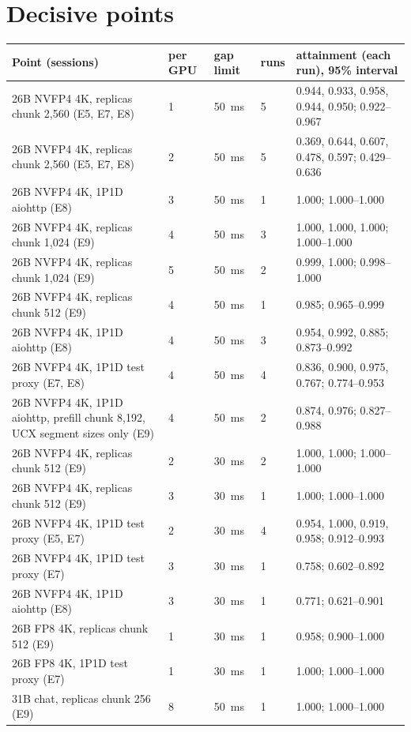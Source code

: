 \documentclass[11pt]{article}
\begin{document}
\section{Decisive points}\label{app:ci}
\begin{table}[H]
\centering\footnotesize
\begin{tabularx}{\linewidth}{Lllll}
\toprule
Point (sessions) & per GPU & gap limit & runs & attainment (each run), 95\% interval \\
\midrule
26B NVFP4 4K, replicas chunk 2,560 (E5, E7, E8) & 1 & 50~ms & 5 & 0.944, 0.933, 0.958, 0.944, 0.950; 0.922--0.967 \\
26B NVFP4 4K, replicas chunk 2,560 (E5, E7, E8) & 2 & 50~ms & 5 & 0.369, 0.644, 0.607, 0.478, 0.597; 0.429--0.636 \\
26B NVFP4 4K, 1P1D aiohttp (E8) & 3 & 50~ms & 1 & 1.000; 1.000--1.000 \\
26B NVFP4 4K, replicas chunk 1,024 (E9) & 4 & 50~ms & 3 & 1.000, 1.000, 1.000; 1.000--1.000 \\
26B NVFP4 4K, replicas chunk 1,024 (E9) & 5 & 50~ms & 2 & 0.999, 1.000; 0.998--1.000 \\
26B NVFP4 4K, replicas chunk 512 (E9) & 4 & 50~ms & 1 & 0.985; 0.965--0.999 \\
26B NVFP4 4K, 1P1D aiohttp (E8) & 4 & 50~ms & 3 & 0.954, 0.992, 0.885; 0.873--0.992 \\
26B NVFP4 4K, 1P1D test proxy (E7, E8) & 4 & 50~ms & 4 & 0.836, 0.900, 0.975, 0.767; 0.774--0.953 \\
26B NVFP4 4K, 1P1D aiohttp, prefill chunk 8,192, UCX segment sizes only (E9) & 4 & 50~ms & 2 & 0.874, 0.976; 0.827--0.988 \\
26B NVFP4 4K, replicas chunk 512 (E9) & 2 & 30~ms & 2 & 1.000, 1.000; 1.000--1.000 \\
26B NVFP4 4K, replicas chunk 512 (E9) & 3 & 30~ms & 1 & 1.000; 1.000--1.000 \\
26B NVFP4 4K, 1P1D test proxy (E5, E7) & 2 & 30~ms & 4 & 0.954, 1.000, 0.919, 0.958; 0.912--0.993 \\
26B NVFP4 4K, 1P1D test proxy (E7) & 3 & 30~ms & 1 & 0.758; 0.602--0.892 \\
26B NVFP4 4K, 1P1D aiohttp (E8) & 3 & 30~ms & 1 & 0.771; 0.621--0.901 \\
26B FP8 4K, replicas chunk 512 (E9) & 1 & 30~ms & 1 & 0.958; 0.900--1.000 \\
26B FP8 4K, 1P1D test proxy (E7) & 1 & 30~ms & 1 & 1.000; 1.000--1.000 \\
31B chat, replicas chunk 256 (E9) & 8 & 50~ms & 1 & 1.000; 1.000--1.000 \\

\end{tabularx}
\end{table}
\end{document}
